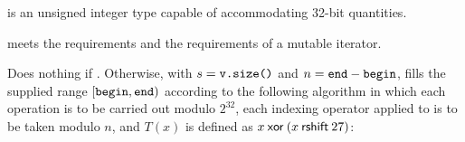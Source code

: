 \begin{itemdescr}
\pnum
\mandates
  is an unsigned integer type capable of accommodating 32-bit quantities.

\pnum
\expects
   meets the
   requirements
  and the requirements of a mutable iterator.

\pnum
\effects
 Does nothing if .
 Otherwise,
 with $s = \texttt{v.size()}$
 and  $n = \texttt{end} - \texttt{begin}$,
 fills the supplied range $[\texttt{begin},\texttt{end})$
 according to the following algorithm
 in which
 each operation is to be carried out modulo $2^{32}$,
 each indexing operator applied to  is to be taken modulo $n$,
 and $T(x)$ is defined as $x \mathbin{\mathsf{xor}} (x \mathbin{\mathsf{rshift}} 27)$:


\end{itemdescr}
